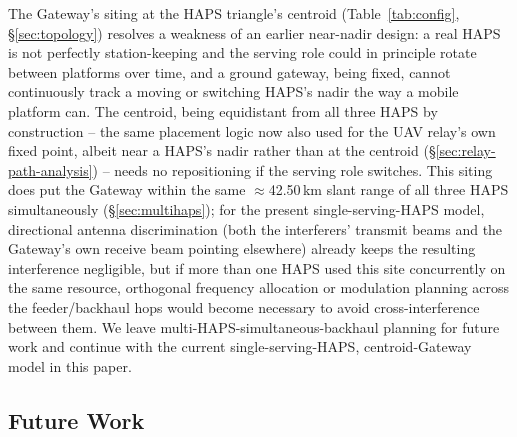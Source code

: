 \documentclass[]{ieeeaccess}
\begin{document}
The Gateway's siting at the HAPS triangle's centroid (Table~\ref{tab:config}, \S\ref{sec:topology}) resolves a weakness of an earlier near-nadir design: a real HAPS is not perfectly station-keeping and the serving role could in principle rotate between platforms over time, and a ground gateway, being fixed, cannot continuously track a moving or switching HAPS's nadir the way a mobile platform can. The centroid, being equidistant from all three HAPS by construction -- the same placement logic now also used for the UAV relay's own fixed point, albeit near a HAPS's nadir rather than at the centroid (\S\ref{sec:relay-path-analysis}) -- needs no repositioning if the serving role switches. This siting does put the Gateway within the same $\approx$42.50\,km slant range of all three HAPS simultaneously (\S\ref{sec:multihaps}); for the present single-serving-HAPS model, directional antenna discrimination (both the interferers' transmit beams and the Gateway's own receive beam pointing elsewhere) already keeps the resulting interference negligible, but if more than one HAPS used this site concurrently on the same resource, orthogonal frequency allocation or modulation planning across the feeder/backhaul hops would become necessary to avoid cross-interference between them. We leave multi-HAPS-simultaneous-backhaul planning for future work and continue with the current single-serving-HAPS, centroid-Gateway model in this paper.

\subsection{Future Work}
\label{sec:roadmap}
\end{document}

